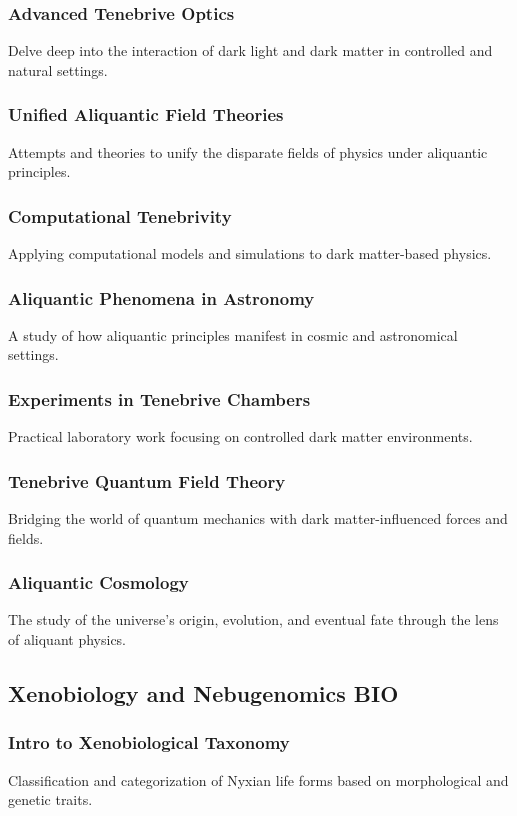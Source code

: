 \subsubsection{Advanced Tenebrive Optics}
Delve deep into the interaction of dark light and dark matter in controlled and natural settings.
\subsubsection{Unified Aliquantic Field Theories}
Attempts and theories to unify the disparate fields of physics under aliquantic principles.
\subsubsection{Computational Tenebrivity}
Applying computational models and simulations to dark matter-based physics.
\subsubsection{Aliquantic Phenomena in Astronomy}
A study of how aliquantic principles manifest in cosmic and astronomical settings.
\subsubsection{Experiments in Tenebrive Chambers}
Practical laboratory work focusing on controlled dark matter environments.
\subsubsection{Tenebrive Quantum Field Theory}
Bridging the world of quantum mechanics with dark matter-influenced forces and fields.
\subsubsection{Aliquantic Cosmology}
The study of the universe's origin, evolution, and eventual fate through the lens of aliquant physics.


\subsection{Xenobiology and Nebugenomics \hfill BIO}
\subsubsection{Intro to Xenobiological Taxonomy}
Classification and categorization of Nyxian life forms based on morphological and genetic traits.
